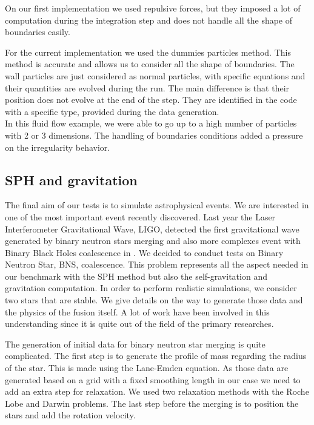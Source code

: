 On our first implementation we used repulsive forces, but they imposed a lot of computation during the integration step and does not handle all the shape of boundaries easily. 

For the current implementation we used the dummies particles method.
This method is accurate and allows us to consider all the shape of boundaries.
The wall particles are just considered as normal particles, with specific equations and their quantities are evolved during the run. 
The main difference is that their position does not evolve at the end of the step.
They are identified in the code with a specific type, provided during the data generation.\\ 

In this fluid flow example, we were able to go up to a high number of particles with 2 or 3 dimensions. 
The handling of boundaries conditions added a pressure on the irregularity behavior. 

\subsection{SPH and gravitation}

The final aim of our tests is to simulate astrophysical events. 
We are interested in one of the most important event recently discovered. 
Last year the Laser Interferometer Gravitational Wave, LIGO, detected the first gravitational wave generated by binary neutron stars merging \cite{abbott2017gw170817} and also more complexes event with Binary Black Holes coalescence in \cite{abbott2017gw170814}.
We decided to conduct tests on Binary Neutron Star, BNS, coalescence. 
This problem represents all the aspect needed in our benchmark with the SPH method but also the self-gravitation and gravitation computation. 
In order to perform realistic simulations, we consider two stars that are stable. 
We give details on the way to generate those data and the physics of the fusion itself. 
A lot of work have been involved in this understanding since it is quite out of the field of the primary researches. 

The generation of initial data for binary neutron star merging is quite complicated. 
The first step is to generate the profile of mass regarding the radius of the star. 
This is made using the Lane-Emden equation. 
As those data are generated based on a grid with a fixed smoothing length in our case we need to add an extra step for relaxation. 
We used two relaxation methods with the Roche Lobe and Darwin problems. 
The last step before the merging is to position the stars and add the rotation velocity. 


